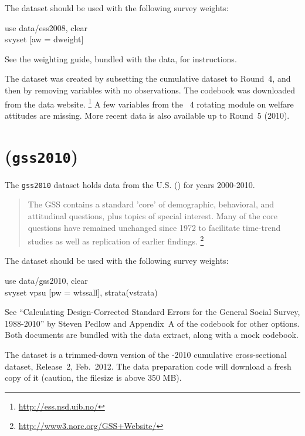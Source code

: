 The \ESS dataset should be used with the following survey weights:

\begin{docspec}
	use data/ess2008, clear\\
	svyset [aw = dweight]
\end{docspec}

See the \ESS weighting guide, bundled with the data, for instructions.

The dataset was created by subsetting the \ESS cumulative dataset to Round~4, and then by removing variables with no observations. The codebook was downloaded from the \ESS data website.%
\footnote{\url{http://ess.nsd.uib.no/}} %
A few variables from the \ESS~4 rotating module on welfare attitudes are missing. More recent data is also available up to Round~5 (2010).

\section*{\gss (\texttt{gss2010})}

The \texttt{gss2010} dataset holds data from the U.S. \gss (\GSS) for years 2000-2010.

\begin{quote}
	The GSS contains a standard 'core' of demographic, behavioral, and attitudinal questions, plus topics of special interest. Many of the core questions have remained unchanged since 1972 to facilitate time-trend studies as well as replication of earlier findings.%
	\footnote{\url{http://www3.norc.org/GSS+Website/}}
\end{quote}

The \GSS dataset should be used with the following survey weights:

\begin{docspec}
	use data/gss2010, clear\\
	svyset vpsu [pw = wtssall], strata(vstrata)
\end{docspec}

See ``Calculating Design-Corrected Standard Errors for the General Social Survey, 1988-2010'' by Steven Pedlow and Appendix~A of the \GSS codebook for other options. Both documents are bundled with the data extract, along with a mock codebook.

The dataset is a trimmed-down version of the -2010 cumulative cross-sectional dataset, Release~2, Feb.~2012. The data preparation code will download a fresh copy of it (caution, the filesize is above 350 MB).

